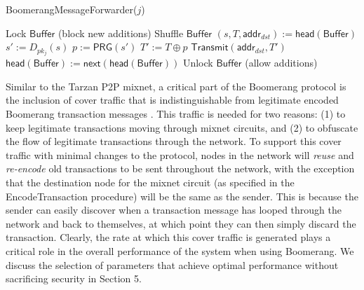 \begin{algorithm}[t!]
\caption{{\sf BoomerangMessageForwarder}($j$)}
\label{alg:handler}
\begin{algorithmic}[1]

\State Lock $\mathsf{Buffer}$ (block new additions)
\State Shuffle $\mathsf{Buffer}$
	\State $(s, T, \mathsf{addr}_{dst}) := \mathsf{head}(\mathsf{Buffer})$
	\State $s' := D_{pk_j}(s)$
	\State $p := \mathsf{PRG}(s')$
	\State $T' := T \oplus p$
	\State $\mathsf{Transmit}(\mathsf{addr}_{dst}, T')$
	\State $\mathsf{head}(\mathsf{Buffer}) := \mathsf{next}(\mathsf{head}(\mathsf{Buffer}))$
\EndFor
\State Unlock $\mathsf{Buffer}$ (allow additions)


\end{algorithmic}
\end{algorithm}

Similar to the Tarzan P2P mixnet, a critical part of the Boomerang protocol is the inclusion of cover traffic that is indistinguishable from legitimate encoded Boomerang transaction messages \cite{tarzan}. This traffic is needed for two reasons: (1) to keep legitimate transactions moving through mixnet circuits, and (2) to obfuscate the flow of legitimate transactions through the network. To support this cover traffic with minimal changes to the protocol, nodes in the network will \emph{reuse} and \emph{re-encode} old transactions to be sent throughout the network, with the exception that the destination node for the mixnet circuit (as specified in the {\sf EncodeTransaction} procedure) will be the same as the sender. This is because the sender can easily discover when a transaction message has looped through the network and back to themselves, at which point they can then simply discard the transaction. Clearly, the rate at which this cover traffic is generated plays a critical role in the overall performance of the system when using Boomerang. We discuss the selection of parameters that achieve optimal performance without sacrificing security in Section 5. 

